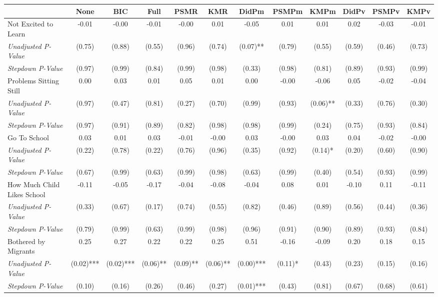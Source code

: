 \begin{tabular}{l c c c c c c c c c c c}
\toprule
 & None & BIC & Full & PSMR & KMR & DidPm & PSMPm & KMPm & DidPv & PSMPv & KMPv \\
\midrule
Not Excited to Learn & -0.01 & -0.00 & -0.01 & -0.00 & 0.01 & -0.05 & 0.01 & 0.01 & 0.02 & -0.03 & -0.01 \\
\quad \textit{Unadjusted P-Value} & (0.75) & (0.88) & (0.55) & (0.96) & (0.74) & (0.07)** & (0.79) & (0.55) & (0.59) & (0.46) & (0.73) \\
\quad \textit{Stepdown P-Value} & (0.97) & (0.99) & (0.84) & (0.99) & (0.98) & (0.33) & (0.98) & (0.81) & (0.89) & (0.93) & (0.99) \\
Problems Sitting Still & 0.00 & 0.03 & 0.01 & 0.05 & 0.01 & 0.00 & -0.00 & -0.06 & 0.05 & -0.02 & -0.04 \\
\quad \textit{Unadjusted P-Value} & (0.97) & (0.47) & (0.81) & (0.27) & (0.70) & (0.99) & (0.93) & (0.06)** & (0.33) & (0.76) & (0.30) \\
\quad \textit{Stepdown P-Value} & (0.97) & (0.91) & (0.89) & (0.82) & (0.98) & (0.98) & (0.99) & (0.24) & (0.75) & (0.93) & (0.84) \\
Go To School & 0.03 & 0.01 & 0.03 & -0.01 & -0.00 & 0.03 & -0.00 & 0.03 & 0.04 & -0.02 & -0.00 \\
\quad \textit{Unadjusted P-Value} & (0.22) & (0.78) & (0.22) & (0.76) & (0.96) & (0.35) & (0.92) & (0.14)* & (0.20) & (0.60) & (0.90) \\
\quad \textit{Stepdown P-Value} & (0.67) & (0.99) & (0.63) & (0.99) & (0.98) & (0.63) & (0.99) & (0.40) & (0.54) & (0.93) & (0.99) \\
How Much Child Likes School & -0.11 & -0.05 & -0.17 & -0.04 & -0.08 & -0.04 & 0.08 & 0.01 & -0.10 & 0.11 & -0.11 \\
\quad \textit{Unadjusted P-Value} & (0.33) & (0.67) & (0.17) & (0.74) & (0.55) & (0.82) & (0.46) & (0.89) & (0.56) & (0.44) & (0.36) \\
\quad \textit{Stepdown P-Value} & (0.79) & (0.99) & (0.63) & (0.99) & (0.98) & (0.96) & (0.91) & (0.90) & (0.89) & (0.93) & (0.84) \\
Bothered by Migrants & 0.25 & 0.27 & 0.22 & 0.22 & 0.25 & 0.51 & -0.16 & -0.09 & 0.20 & 0.18 & 0.15 \\
\quad \textit{Unadjusted P-Value} & (0.02)*** & (0.02)*** & (0.06)** & (0.09)** & (0.06)** & (0.00)*** & (0.11)* & (0.43) & (0.23) & (0.15) & (0.16) \\
\quad \textit{Stepdown P-Value} & (0.10) & (0.16) & (0.26) & (0.46) & (0.27) & (0.01)*** & (0.43) & (0.81) & (0.67) & (0.68) & (0.61) \\

\end{tabular}
